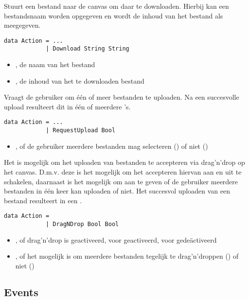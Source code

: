 Stuurt een bestand naar de canvas om daar te downloaden. Hierbij kan een bestandsnaam worden opgegeven en wordt de inhoud van het bestand als  meegegeven.
\begin{lstlisting}
data Action = ...
			| Download String String
\end{lstlisting}
\begin{itemize}
	\item {}, de naam van het bestand
	\item {}, de inhoud van het te downloaden bestand
\end{itemize}

Vraagt de gebruiker om één of meer bestanden te uploaden. Na een succesvolle upload resulteert dit in één of meerdere 's.
\begin{lstlisting}
data Action = ...
			| RequestUpload Bool
\end{lstlisting}
\begin{itemize}
	\item {}, of de gebruiker meerdere bestanden mag selecteren () of niet ()
\end{itemize}

Het is mogelijk om het uploaden van bestanden te accepteren via drag'n'drop op het canvas. D.m.v. deze  is het mogelijk om het accepteren hiervan aan en uit te schakelen, daarnaast is het mogelijk om aan te geven of de gebruiker meerdere bestanden in één keer kan uploaden of niet. Het succesvol uploaden van een bestand resulteert in een .
\begin{lstlisting}
data Action = 
			| DragNDrop Bool Bool
\end{lstlisting}
\begin{itemize}
	\item {}, of drag'n'drop is geactiveerd,  voor geactiveerd,  voor gedeäctiveerd
	\item {}, of het mogelijk is om meerdere bestanden tegelijk te drag'n'droppen () of niet ()
\end{itemize}




\subsection{Events}




























